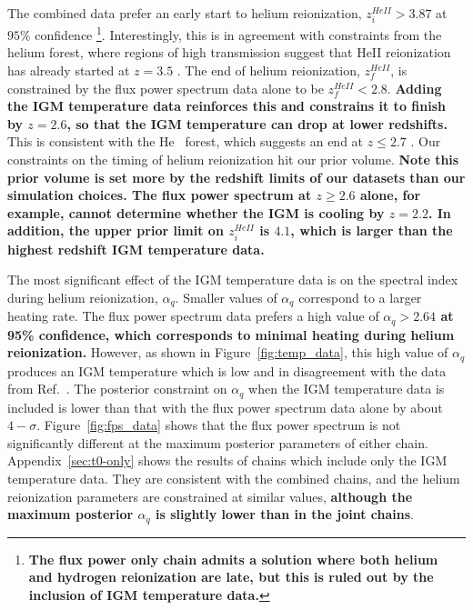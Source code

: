 The combined data prefer an early start to helium reionization, $z_i^{HeII} > 3.87$ at $95\%$ confidence \footnote{\textbf{The flux power only chain admits a solution where both helium and hydrogen reionization are late, but this is ruled out by the inclusion of IGM temperature data.}}.
Interestingly, this is in agreement with constraints from the helium \lya forest, where regions of high transmission suggest that HeII reionization has already started at $z = 3.5$ \cite{2016ApJ...825..144W, 2021ApJ...912...38M}.
The end of helium reionization, $z_f^{HeII}$, is constrained by the flux power spectrum data alone to be $z_f^{HeII} < 2.8$. \textbf{Adding the IGM temperature data reinforces this and constrains it to finish by $z=2.6$, so that the IGM temperature can drop at lower redshifts. }
This is consistent with the He~{} \lya forest, which suggests an end at $z \leq 2.7$ \cite{2009ApJ...704L..89M, 2011ApJ...733L..24W, 2019ApJ...875..111W}.
Our constraints on the timing of helium reionization hit our prior volume. \textbf{Note this prior volume is set more by the redshift limits of our datasets than our simulation choices. The flux power spectrum at $z\geq  2.6$ alone, for example, cannot determine whether the IGM is cooling by $z=2.2$. In addition, the upper prior limit on $z^{HeII}_i$ is $4.1$, which is larger than the highest redshift IGM temperature data.}

The most significant effect of the IGM temperature data is on the spectral index during helium reionization, $\alpha_q$.
Smaller values of $\alpha_q$ correspond to a larger heating rate.
The flux power spectrum data prefers a high value of \textbf{$\alpha_q > 2.64$ at 95\% confidence, which corresponds to minimal heating during helium reionization.}
However, as shown in Figure~\ref{fig:temp_data}, this high value of $\alpha_q$ produces an IGM temperature which is low and in disagreement with the data from Ref.~\cite{2021MNRAS.506.4389G}. The posterior constraint on $\alpha_q$ when the IGM temperature data is included is lower than that with the flux power spectrum data alone by about $4-\sigma$.
Figure~\ref{fig:fps_data} shows that the flux power spectrum is not significantly different at the maximum posterior parameters of either chain.
Appendix~\ref{sec:t0-only} shows the results of chains which include only the IGM temperature data.
They are consistent with the combined chains, and the helium reionization parameters are constrained at similar values, \textbf{although the maximum posterior $\alpha_q$ is slightly lower than in the joint chains}.

